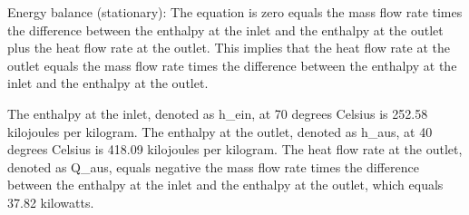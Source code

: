 Energy balance (stationary):
The equation is zero equals the mass flow rate times the difference between the enthalpy at the inlet and the enthalpy at the outlet plus the heat flow rate at the outlet. This implies that the heat flow rate at the outlet equals the mass flow rate times the difference between the enthalpy at the inlet and the enthalpy at the outlet.

The enthalpy at the inlet, denoted as h_ein, at 70 degrees Celsius is 252.58 kilojoules per kilogram. The enthalpy at the outlet, denoted as h_aus, at 40 degrees Celsius is 418.09 kilojoules per kilogram. The heat flow rate at the outlet, denoted as Q_aus, equals negative the mass flow rate times the difference between the enthalpy at the inlet and the enthalpy at the outlet, which equals 37.82 kilowatts.